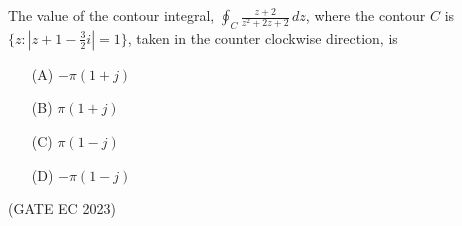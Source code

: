 \begin{enumerate}[label=\thechapter.\arabic*,ref=\thechapter.\theenumi]
The value of the contour integral, $\oint_C \frac{z + 2}{z^2 + 2z + 2} \, dz$, where the contour $C$ is $\{ z : |z + 1 - \frac{3}{2}i| = 1 \}$, taken in the counter clockwise direction, is \\

\begin{enumerate}
  \item[(A)] $-\pi(1+j) $
  \item[(B)] $\pi(1+j)$
  \item[(C)] $\pi(1-j) $
  \item[(D)] $-\pi(1-j)$
\end{enumerate}

\hfill{(GATE EC 2023)}\\
\solution
\end{enumerate}
